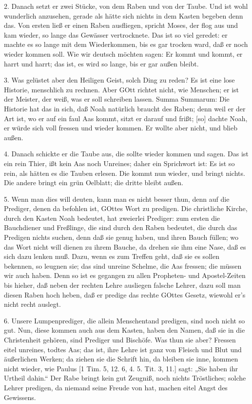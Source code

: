2. Danach setzt er zwei Stücke, von dem Raben und von der Taube. Und ist wohl wunderlich anzusehen, gerade als hätte sich nichts in dem Kasten begeben denn das. Von ersten ließ er einen Raben ausfliegen, spricht Moses, der flog aus und kam wieder, so lange das Gewässer vertrocknete. Das ist so viel geredet: er machte es so lange mit dem Wiederkommen, bis es gar trocken ward, daß er noch wieder kommen soll. Wie wir deutsch möchten sagen: Er kommt und kommt, er harrt und harrt; das ist, es wird so lange, bis er gar außen bleibt.

3. Was gelüstet aber den Heiligen Geist, solch Ding zu reden? Es ist eine lose Historie, menschlich zu rechnen. Aber GOtt richtet nicht, wie Menschen; er ist der Meister, der weiß, was er soll schreiben lassen. Summa Summarum: Die Historie hat das in sich, daß Noah natürlich braucht des Raben; denn weil er der Art ist, wo er auf ein faul Aas kommt, sitzt er darauf und frißt; [so] dachte Noah, er würde sich voll fressen und wieder kommen. Er wollte aber nicht, und blieb außen.

4. Danach schickte er die Taube aus, die sollte wieder kommen und sagen. Das ist ein rein Thier, ißt kein Aas noch Unreines; daher ein Sprichwort ist: Es ist so rein, als hätten es die Tauben erlesen. Die kommt nun wieder, und bringt nichts. Die andere bringt ein grün Oelblatt; die dritte bleibt außen.

5. Wenn man dies will deuten, kann man es nicht besser thun, denn auf die Prediger, denen da befohlen ist, GOttes Wort zu predigen. Die christliche Kirche, durch den Kasten Noah bedeutet, hat zweierlei Prediger: zum ersten die Bauchdiener und Freßlinge, die sind durch den Raben bedeutet, die durch das Predigen nichts suchen, denn daß sie genug haben, und ihren Bauch füllen; wo das Wort nicht will dienen zu ihrem Bauche, da drehen sie ihm eine Nase, daß es sich dazu lenken muß. Dazu, wenn es zum Treffen geht, daß sie es sollen bekennen, so leugnen sie; das sind unreine Schelme, die Aas fressen; die müssen wir auch haben. Denn so ist es gegangen zu allen Propheten- und Apostel-Zeiten bis hieher, daß neben der rechten Lehre ausliegen falsche Lehrer, dazu soll man diesen Raben hoch heben, daß er predige das rechte GOttes Gesetz, wiewohl er’s nicht recht auslegt.

6. Unsere Lumpenprediger, die allein Menschentand predigen, sind noch nicht so gut. Nun, diese kommen auch aus dem Kasten, haben den Namen, daß sie in die Christenheit gehören, sind Prediger und Bischöfe. Was thun sie aber? Fressen eitel unreines, todtes Aas; das ist, ihre Lehre ist ganz von Fleisch und Blut und äußerlichen Werken; da ziehen sie die Schrift hin, da bleiben sie inne, kommen nicht wieder, wie Paulus [1 Tim. 5, 12. 6, 4. 5. Tit. 3, 11.] sagt: „Sie haben ihr Urtheil dahin.“ Der Rabe bringt kein gut Zeugniß, noch nichts Tröstliches; solche Lehrer predigen, da niemand seine Freude von hat, machen eitel Angst des Gewissens.

